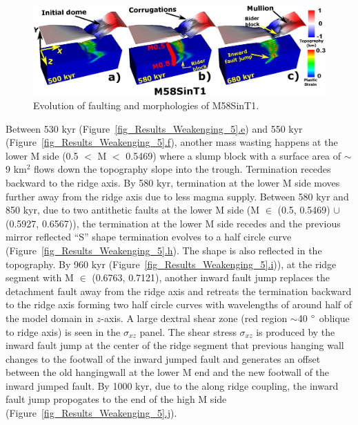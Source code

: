\begin{figure}[h]
 \centering
  \includegraphics[width=1.0\textwidth]{./Figures/fig_Results_3_4_2_M58SinT1_mullion_riderBlock_inwardFaultJump.eps}
 \caption{Evolution of faulting and morphologies of M58SinT1.}
\label{fig_Results_3_4_2_M58SinT1_mullion_riderBlock_inwardFaultJump}
\end{figure}

Between 530 kyr (Figure~\hyperref[fig_Results_Weakenging_5]{\ref{fig_Results_Weakenging_5}.e}) and 550 kyr (Figure~\hyperref[fig_Results_Weakenging_5]{\ref{fig_Results_Weakenging_5}.f}), another mass wasting happens at the lower M side (0.5 $<$ M $<$ 0.5469) where a slump block with a surface area of $\sim$9 km$^{2}$ flows down the topography slope into the trough. Termination recedes backward to the ridge axis. By 580 kyr, termination at the lower M side moves further away from the ridge axis due to less magma supply. Between 580 kyr and 850 kyr, due to two antithetic faults at the lower M side (M $\in$ (0.5, 0.5469) $\cup$ (0.5927, 0.6567)), the termination at the lower M side recedes and the previous mirror reflected ``S'' shape termination evolves to a half circle curve (Figure~\hyperref[fig_Results_Weakenging_5]{\ref{fig_Results_Weakenging_5}.h}). The shape is also reflected in the topography. By 960 kyr (Figure~\hyperref[fig_Results_Weakenging_5]{\ref{fig_Results_Weakenging_5}.i})), at the ridge segment with M $\in$ (0.6763, 0.7121), another inward fault jump replaces the detachment fault away from the ridge axis and retreats the termination backward to the ridge axis forming two half circle curves with wavelengths of around half of the model domain in $z$-axis. A large dextral shear zone (red region $\sim$40 $\degree$ oblique to ridge axis) is seen in the $\sigma_{xz}$ panel. The shear stress $\sigma_{xz}$ is produced by the inward fault jump at the center of the ridge segment that previous hanging wall changes to the footwall of the inward jumped fault and generates an offset between the old hangingwall at the lower M end and the new footwall of the inward jumped fault. By 1000 kyr, due to the along ridge coupling, the inward fault jump propogates to the end of the high M side (Figure~\hyperref[fig_Results_Weakenging_5]{\ref{fig_Results_Weakenging_5}.j}). 

